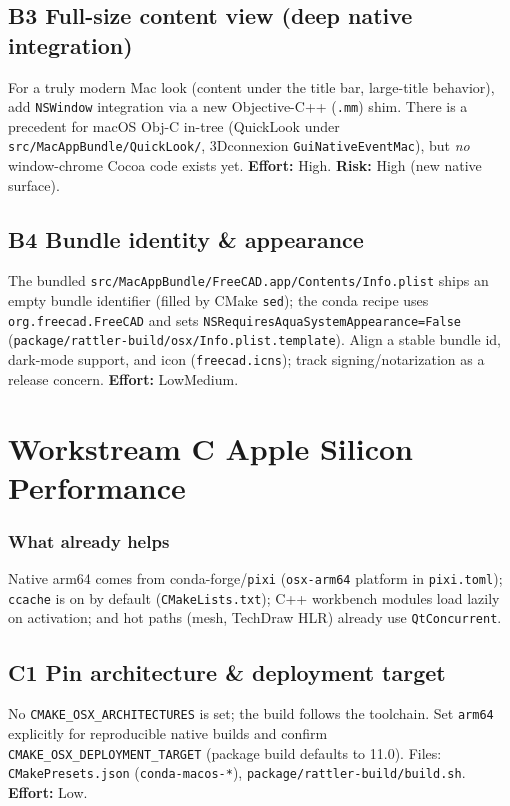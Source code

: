 \documentclass[11pt]{article}
\begin{document}
\subsection{B3 \textemdash{} Full-size content view (deep native integration)}
For a truly modern Mac look (content under the title bar, large-title behavior),
add \texttt{NSWindow} integration via a new Objective-C++ (\texttt{.mm}) shim. There is a
precedent for macOS Obj-C in-tree (QuickLook under \texttt{src/MacAppBundle/QuickLook/},
3Dconnexion \texttt{GuiNativeEventMac}), but \emph{no} window-chrome Cocoa code exists yet.
\textbf{Effort:} High. \quad\textbf{Risk:} High (new native surface).

\subsection{B4 \textemdash{} Bundle identity \& appearance}
The bundled \texttt{src/MacAppBundle/FreeCAD.app/Contents/Info.plist} ships an empty
bundle identifier (filled by CMake \texttt{sed}); the conda recipe uses
\texttt{org.freecad.FreeCAD} and sets \texttt{NSRequiresAquaSystemAppearance=False}
(\texttt{package/rattler-build/osx/Info.plist.template}). Align a stable bundle id,
dark-mode support, and icon (\texttt{freecad.icns}); track signing/notarization as a
release concern.
\textbf{Effort:} Low\textendash Medium.

\section{Workstream C \; \; Apple Silicon Performance}

\subsubsection{What already helps}
Native arm64 comes from conda-forge/\texttt{pixi} (\texttt{osx-arm64} platform in
\texttt{pixi.toml}); \texttt{ccache} is on by default (\texttt{CMakeLists.txt}); C++ workbench
modules load lazily on activation; and hot paths (mesh, TechDraw HLR) already use
\texttt{QtConcurrent}.

\subsection{C1 \textemdash{} Pin architecture \& deployment target}
No \texttt{CMAKE\_OSX\_ARCHITECTURES} is set; the build follows the toolchain. Set
\texttt{arm64} explicitly for reproducible native builds and confirm
\texttt{CMAKE\_OSX\_DEPLOYMENT\_TARGET} (package build defaults to 11.0). Files:
\texttt{CMakePresets.json} (\texttt{conda-macos-*}), \texttt{package/rattler-build/build.sh}.
\textbf{Effort:} Low.
\end{document}
